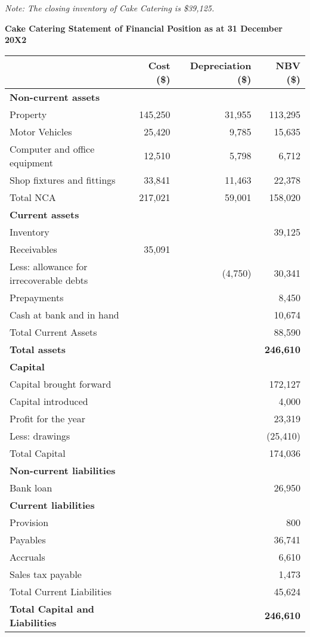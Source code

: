 \textit{Note: The closing inventory of Cake Catering is \$39,125.}





\textbf{Cake Catering Statement of Financial Position as at 31 December 20X2}

\begin{tabular}{lrrr}
\toprule
 & \textbf{Cost (\$)} & \textbf{Depreciation (\$)} & \textbf{NBV (\$)} \\
\midrule
\textbf{Non-current assets} & & & \\
Property & 145,250 & 31,955 & 113,295 \\
Motor Vehicles & 25,420 & 9,785 & 15,635 \\
Computer and office equipment & 12,510 & 5,798 & 6,712 \\
Shop fixtures and fittings & 33,841 & 11,463 & 22,378 \\
\addlinespace
Total NCA & 217,021 & 59,001 & 158,020 \\
\midrule
\textbf{Current assets} & & & \\
Inventory & & & 39,125 \\
Receivables & 35,091 & & \\
Less: allowance for irrecoverable debts & & (4,750) & 30,341 \\
Prepayments & & & 8,450 \\
Cash at bank and in hand & & & 10,674 \\
\addlinespace
Total Current Assets & & & 88,590 \\
\midrule
\textbf{Total assets} & & & \textbf{246,610} \\
\midrule
\textbf{Capital} & & & \\
Capital brought forward & & & 172,127 \\
Capital introduced & & & 4,000 \\
Profit for the year & & & 23,319 \\
Less: drawings & & & (25,410) \\
\addlinespace
Total Capital & & & 174,036 \\
\midrule
\textbf{Non-current liabilities} & & & \\
Bank loan & & & 26,950 \\
\midrule
\textbf{Current liabilities} & & & \\
Provision & & & 800 \\
Payables & & & 36,741 \\
Accruals & & & 6,610 \\
Sales tax payable & & & 1,473 \\
\addlinespace
Total Current Liabilities & & & 45,624 \\
\midrule
\textbf{Total Capital and Liabilities} & & & \textbf{246,610} \\
\bottomrule
\end{tabular}

